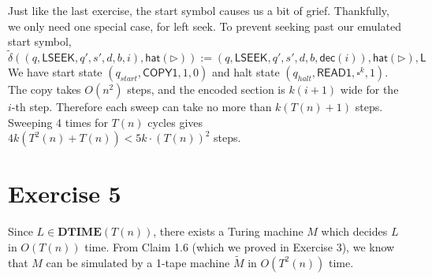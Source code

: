 \documentclass[12pt]{article}
\begin{document}
Just like the last exercise, the start symbol causes us a bit of grief. Thankfully, we only need one special case, for left seek. To prevent seeking past our emulated start symbol,
$$
\tilde{\delta}((q, \textsf{LSEEK}, q', s', d, b, i), \textsf{hat}(\triangleright)) := (q, \textsf{LSEEK}, q', s', d, b, \textsf{dec}(i)), \textsf{hat}(\triangleright), \textsf{L}
$$
We have start state $(q_{start}, \textsf{COPY1}, 1, 0)$ and halt state $(q_{halt}, \textsf{READ1}, \square^k, 1)$. The copy takes $O(n^2)$ steps, and the encoded section is $k(i+1)$ wide for the $i$-th step. Therefore each sweep can take no more than $k(T(n) + 1)$ steps. Sweeping 4 times for $T(n)$ cycles gives $4k(T^2(n) + T(n)) < 5k \cdot (T(n))^2$ steps.

\section*{Exercise 5}


Since $L \in \textbf{DTIME}(T(n))$, there exists a Turing machine $M$ which decides $L$ in $O(T(n))$ time. From Claim 1.6 (which we proved in Exercise 3), we know that $M$ can be simulated by a 1-tape machine $\tilde{M}$ in $O(T^2(n))$ time.
\end{document}
